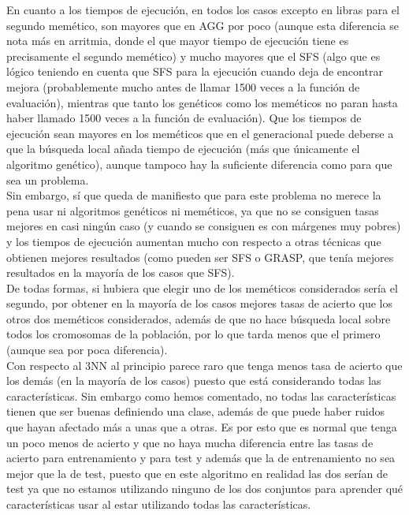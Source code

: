 \documentclass[12pt]{article}
\begin{document}
En cuanto a los tiempos de ejecución, en todos los casos excepto en libras para el segundo memético, son mayores que en AGG por poco (aunque esta diferencia se nota más en arritmia, donde el que mayor tiempo de ejecución tiene es precisamente el segundo memético) y mucho mayores que el SFS (algo que es lógico teniendo en cuenta que SFS para la ejecución cuando deja de encontrar mejora (probablemente mucho antes de llamar 1500 veces a la función de evaluación), mientras que tanto los genéticos como los meméticos no paran hasta haber llamado 1500 veces a la función de evaluación). Que los tiempos de ejecución sean mayores en los meméticos que en el generacional puede deberse a que la búsqueda local añada tiempo de ejecución (más que únicamente el algoritmo genético), aunque tampoco hay la suficiente diferencia como para que sea un problema.\\

Sin embargo, sí que queda de manifiesto que para este problema no merece la pena usar ni algoritmos genéticos ni meméticos, ya que no se consiguen tasas mejores en casi ningún caso (y cuando se consiguen es con márgenes muy pobres) y los tiempos de ejecución aumentan mucho con respecto a otras técnicas que obtienen mejores resultados (como pueden ser SFS o GRASP, que tenía mejores resultados en la mayoría de los casos que SFS).\\

De todas formas, si hubiera que elegir uno de los meméticos considerados sería el segundo, por obtener en la mayoría de los casos mejores tasas de acierto que los otros dos meméticos considerados, además de que no hace búsqueda local sobre todos los cromosomas de la población, por lo que tarda menos que el primero (aunque sea por poca diferencia).\\

Con respecto al 3NN al principio parece raro que tenga menos tasa de acierto que los demás
(en la mayoría de los casos) puesto que está considerando todas las características. Sin embargo
como hemos comentado, no todas las características tienen que ser buenas definiendo una clase,
además de que puede haber ruidos que hayan afectado más a unas que a otras. Es por esto que
es normal que tenga un poco menos de acierto y que no haya mucha diferencia entre las tasas de
acierto para entrenamiento y para test y además que la de entrenamiento no sea mejor que la de
test, puesto que en este algoritmo en realidad las dos serían de test ya que no estamos utilizando
ninguno de los dos conjuntos para aprender qué características usar al estar utilizando todas
las características.
\end{document}
